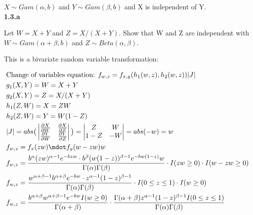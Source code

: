 \documentclass[12pt]{article}
\begin{document}
    \(X \sim Gam(\alpha, b)\) and \(Y \sim Gam(\beta, b)\) and X is independent of Y. \\

    \textbf{1.3.a}

    Let \(W = X + Y\) and \(Z = X / (X + Y)\). Show that W and Z are independent with
    \(W \sim Gam(\alpha + \beta, b)\) and \(Z \sim Beta (\alpha, \beta)\).

    This is a bivariate random variable transformation:

    \begin{align*}
        & \text{Change of variables equation: } f_{w,z} = f_{x,y}(h_1 (w, z), h_2(w, z)) |J| \\
        & g_1(X, Y) = W = X + Y \\
        & g_2(X, Y) = Z = X / (X + Y) \\
        & h_1(Z, W) = X = ZW \\
        & h_2(Z, W) = Y = W (1 - Z) \\
        &|J| = abs \big( \begin{vmatrix} \frac{\partial X}{\partial W} &
          \frac{\partial X}{\partial Z} \\
          \frac{\partial Y}{\partial W} & \frac{\partial Y}{\partial Z}
          \end{vmatrix} \big) =
          \begin{vmatrix} Z & W \\ 1 - Z & -W \end{vmatrix}
          = abs(-w) = w \\
        &f_{w,z} = f_x(zw) \mdot f_y(w-zw) w \\
        &f_{w,z} = \frac{b^{\alpha} (zw)^{\alpha - 1} e^{-bzw} \cdot b^{\beta}
                       (w(1- z))^{\beta - 1} e^{-bw(1-z)} w}{\Gamma(\alpha) \Gamma(\beta)}
           \cdot I(zw \geq 0) \cdot I(w - zw \geq 0) \\
        &f_{w,z} = \frac{w^{\alpha + \beta - 1} b^{\alpha + \beta} e^{-bw}
              \cdot z^{\alpha - 1} (1 - z)^{\beta -1}} {\Gamma(\alpha) \Gamma(\beta)}
              \cdot I(0 \leq z \leq 1) \cdot I(w \geq 0) \\
        & f_{w,z} = \frac{b^{\alpha + \beta} w^{\alpha + \beta -1} e^{-bw}
                   I( w \geq 0)}{\Gamma(\alpha + \beta)} \cdot
                   \frac{\Gamma(\alpha + \beta) z^{\alpha - 1} (1-z)^{\beta -1}
                   I( 0 \leq z \leq 1)}{\Gamma(\alpha) \Gamma(\beta)}
    \end{align*}
\end{document}
